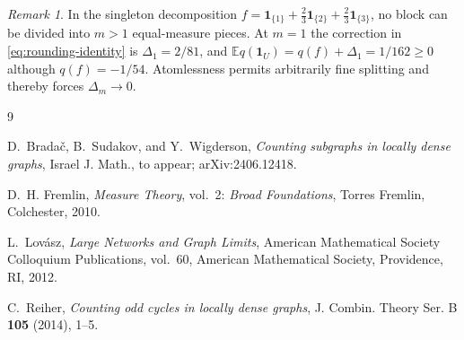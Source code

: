 \documentclass[reqno]{amsart}
\theoremstyle{plain}
\theoremstyle{remark}
\newtheorem{remark}[theorem]{Remark}
\newcommand{\one}{\mathbf 1}
\newcommand{\E}{\mathbb E}
\begin{document}
\begin{remark}\label{rem:failure}
In the singleton decomposition
$f=\one_{\{1\}}+\tfrac23\one_{\{2\}}+\tfrac23\one_{\{3\}}$, no block can be
divided into $m>1$ equal-measure pieces. At $m=1$ the correction in
\eqref{eq:rounding-identity} is $\Delta_1=2/81$, and
$\E q(\one_U)=q(f)+\Delta_1=1/162\geq0$ although $q(f)=-1/54$.
Atomlessness permits arbitrarily fine splitting and thereby forces
$\Delta_m\to0$.
\end{remark}

\begin{thebibliography}{9}

D.~Brada\v{c}, B.~Sudakov, and Y.~Wigderson,
\emph{Counting subgraphs in locally dense graphs},
Israel J. Math., to appear; arXiv:2406.12418.

D.~H. Fremlin,
\emph{Measure Theory}, vol.~2: \emph{Broad Foundations},
Torres Fremlin, Colchester, 2010.

L.~Lov\'asz,
\emph{Large Networks and Graph Limits},
American Mathematical Society Colloquium Publications, vol.~60,
American Mathematical Society, Providence, RI, 2012.

C.~Reiher,
\emph{Counting odd cycles in locally dense graphs},
J. Combin. Theory Ser. B \textbf{105} (2014), 1--5.

\end{thebibliography}
\end{document}
